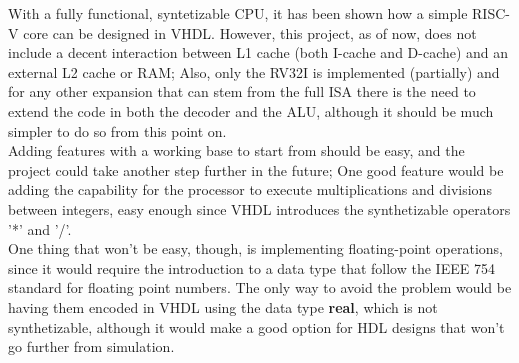 With a fully functional, syntetizable CPU, it has been shown how a simple RISC-V core can be designed in VHDL. However, this project, as of now, does not include a decent interaction between L1 cache (both I-cache and D-cache) and an external L2 cache or RAM; Also, only the RV32I is implemented (partially) and for any other expansion that can stem from the full ISA there is the need to extend the code in both the decoder and the ALU, although it should be much simpler to do so from this point on. \\
Adding features with a working base to start from should be easy, and the project could take another step further in the future; One good feature would be adding the capability for the processor to execute multiplications and divisions between integers, easy enough since VHDL introduces the synthetizable operators '*' and '/'.\\
One thing that won't be easy, though, is implementing floating-point operations, since it would require the introduction to a data type that follow the IEEE 754 standard for floating point numbers. The only way to avoid the problem would be having them encoded in VHDL using the data type \textbf{real}, which is not synthetizable, although it would make a good option for HDL designs that won't go further from simulation.\\